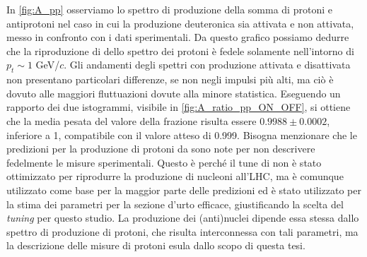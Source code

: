 \begin{figure}[htb]
\begin{subfigure}{.49\textwidth}
        \caption{}
        \label{fig:A_antideuteron}
    \end{subfigure}
    \label{fig:A_(anti)deuteron}
\end{figure}

In \autoref{fig:A_pp} osserviamo lo spettro di produzione della somma di protoni e antiprotoni nel caso in cui la produzione deuteronica sia attivata e non attivata, messo in confronto con i dati sperimentali.
Da questo grafico possiamo dedurre che la riproduzione di \pythiaa{} dello spettro dei protoni è fedele solamente nell'intorno di $p_t \sim 1$ GeV/$c$.
Gli andamenti degli spettri con produzione attivata e disattivata non presentano  particolari differenze, se non negli impulsi più alti, ma ciò è dovuto alle maggiori fluttuazioni dovute alla minore statistica.
Eseguendo un rapporto dei due istogrammi, visibile in \autoref{fig:A_ratio_pp_ON_OFF}, si ottiene che la media pesata del valore della frazione risulta essere $0.9988 \pm 0.0002$, inferiore a 1, compatibile con il valore atteso di 0.999.
Bisogna menzionare che le predizioni per la produzione di protoni da \pythiaa{} sono note per non descrivere fedelmente le misure sperimentali.
Questo è perché il tune di \pythiaa{} non è stato ottimizzato per riprodurre la produzione di nucleoni all'LHC, ma è comunque utilizzato come base per la maggior parte delle predizioni ed è stato utilizzato per la stima dei parametri per la sezione d'urto efficace, giustificando la scelta del \textit{tuning} per questo studio.
La produzione dei (anti)nuclei dipende essa stessa dallo spettro di produzione di protoni, che risulta interconnessa con tali parametri, ma la descrizione delle misure di protoni esula dallo scopo di questa tesi.

